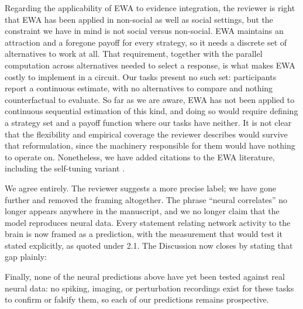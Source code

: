 Regarding the applicability of EWA to evidence integration, the reviewer is right that EWA has been applied in non-social as well as social settings, but the constraint we have in mind is not social versus non-social. EWA maintains an attraction and a foregone payoff for every strategy, so it needs a discrete set of alternatives to work at all. That requirement, together with the parallel computation across alternatives needed to select a response, is what makes EWA costly to implement in a circuit. Our tasks present no such set: participants report a continuous estimate, with no alternatives to compare and nothing counterfactual to evaluate. So far as we are aware, EWA has not been applied to continuous sequential estimation of this kind, and doing so would require defining a strategy set and a payoff function where our tasks have neither. It is not clear that the flexibility and empirical coverage the reviewer describes would survive that reformulation, since the machinery responsible for them would have nothing to operate on. Nonetheless, we have added citations to the EWA literature, including the self-tuning variant \citep{camerer1999experience, ho2007selftuning}.



We agree entirely. The reviewer suggests a more precise label; we have gone further and removed the framing altogether. The phrase ``neural correlates'' no longer appears anywhere in the manuscript, and we no longer claim that the model reproduces neural data. Every statement relating network activity to the brain is now framed as a prediction, with the measurement that would test it stated explicitly, as quoted under 2.1. The Discussion now closes by stating that gap plainly:

\begin{ms}
Finally, none of the neural predictions above have yet been tested against real neural data: no spiking, imaging, or perturbation recordings exist for these tasks to confirm or falsify them, so each of our predictions remains prospective.
\end{ms}

